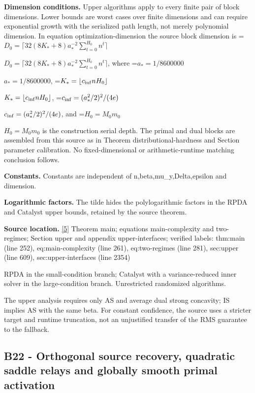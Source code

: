 \documentclass[10pt,a4paper]{article}
\newcommand{\AtlasMath}[1]{\par\begingroup\centering\setbox0=\hbox{$\displaystyle #1$}\ifdim\wd0>1.4\linewidth\typeout{ATLAS WIDE FORMULA: \the\wd0}\fi\ifdim\wd0>\linewidth\resizebox{\linewidth}{!}{\box0}\else\box0\fi\par\endgroup}
\newcommand{\AtlasInlineMath}[1]{\begingroup\setbox0=\hbox{$#1$}\ifdim\wd0>.4\linewidth\endgroup\AtlasMath{#1}\else\endgroup$#1$\fi}
\begin{document}
\textbf{Dimension conditions.} Upper algorithms apply to every finite pair of block dimensions. Lower bounds are worst cases over finite dimensions and can require exponential growth with the serialized path length, not merely polynomial dimension. In equation optimization-dimension the source block dimension is \AtlasInlineMath{D_0=\lceil32(8K_*+8)a_*^{-2}\sum_{t=0}^{H_0}n^t\rceil}, where \AtlasInlineMath{a_*=1/8600000}, \AtlasInlineMath{K_*=\lfloor c_{\rm inf}nH_0\rfloor}, \AtlasInlineMath{c_{\rm inf}=(a_*^2/2)^2/(4e)}, and \AtlasInlineMath{H_0=M_0m_0} is the construction serial depth. The primal and dual blocks are assembled from this source as in Theorem distributional-hardness and Section parameter calibration. No fixed-dimensional or arithmetic-runtime matching conclusion follows.



\textbf{Constants.} Constants are independent of n,beta,mu\_y,Delta,epsilon and dimension.



\textbf{Logarithmic factors.} The tilde hides the polylogarithmic factors in the RPDA and Catalyst upper bounds, retained by the source theorem.



\textbf{Source location.} \href{https://github.com/WU-Wendao/Colombo/blob/main/colombo_sensorium/Complexity_altas/data/sources/colombo/U06/manuscript.pdf}{[5]} Theorem main; equations main-complexity and two-regimes; Section upper and appendix upper-interfaces; verified labels: thm:main (line 252), eq:main-complexity (line 261), eq:two-regimes (line 281), sec:upper (line 609), sec:upper-interfaces (line 2354)



RPDA in the small-condition branch; Catalyst with a variance-reduced inner solver in the large-condition branch. Unrestricted randomized algorithms.



The upper analysis requires only AS and average dual strong concavity; IS implies AS with the same beta. For constant confidence, the source uses a stricter target and runtime truncation, not an unjustified transfer of the RMS guarantee to the fallback.



\subsection{B22 - Orthogonal source recovery, quadratic saddle relays and globally smooth primal activation}
\end{document}
